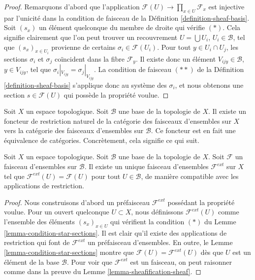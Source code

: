 \begin{proof}
Remarquons d'abord que l'application
$\mathcal{F}(U) \to \prod\nolimits_{x \in U} \mathcal{F}_x$
est injective par l'unicité dans la condition de faisceau
de la Définition \ref{definition-sheaf-basis}. Soit $(s_x)$
un élément quelconque du membre de droite qui vérifie $(*)$.
Cela signifie clairement que l'on peut trouver un recouvrement $U = \bigcup U_i$,
$U_i \in \mathcal{B}$, tel que $(s_x)_{x \in U_i}$ provienne
de certains $\sigma_i \in \mathcal{F}(U_i)$. Pour tout $y \in U_i \cap U_j$,
les sections $\sigma_i$ et $\sigma_j$ coïncident dans la fibre
$\mathcal{F}_y$. Il existe donc un élément $V_{ijy} \in \mathcal{B}$,
$y \in V_{ijy}$, tel que $\sigma_i|_{V_{ijy}} = \sigma_j|_{V_{ijy}}$.
La condition de faisceau $(**)$ de la Définition \ref{definition-sheaf-basis}
s'applique donc au système des $\sigma_i$, et nous obtenons une section
$s \in \mathcal{F}(U)$ qui possède la propriété voulue.
\end{proof}

\noindent
Soit $X$ un espace topologique.
Soit $\mathcal{B}$ une base de la topologie de $X$.
Il existe un foncteur de restriction naturel de la catégorie
des faisceaux d'ensembles sur $X$ vers la catégorie des faisceaux
d'ensembles sur $\mathcal{B}$. Ce foncteur est en fait une équivalence
de catégories. Concrètement, cela signifie ce qui suit.

\begin{lemma}
\label{lemma-extend-off-basis}
Soit $X$ un espace topologique.
Soit $\mathcal{B}$ une base de la topologie de $X$.
Soit $\mathcal{F}$ un faisceau d'ensembles sur $\mathcal{B}$.
Il existe un unique faisceau d'ensembles $\mathcal{F}^{ext}$
sur $X$ tel que $\mathcal{F}^{ext}(U) = \mathcal{F}(U)$
pour tout $U \in \mathcal{B}$, de manière compatible avec les applications
de restriction.
\end{lemma}

\begin{proof}
Nous construisons d'abord un préfaisceau $\mathcal{F}^{ext}$ possédant la
propriété voulue. Pour un ouvert quelconque $U \subset X$, nous
définissons $\mathcal{F}^{ext}(U)$ comme l'ensemble des éléments
$(s_x)_{x \in U}$ qui vérifient la condition $(*)$ du
Lemme \ref{lemma-condition-star-sections}.
Il est clair qu'il existe des applications de restriction
qui font de $\mathcal{F}^{ext}$ un préfaisceau d'ensembles.
En outre, le Lemme \ref{lemma-condition-star-sections} montre que
$\mathcal{F}(U) = \mathcal{F}^{ext}(U)$
dès que $U$ est un élément de la base $\mathcal{B}$.
Pour voir que $\mathcal{F}^{ext}$ est un faisceau, on peut
raisonner comme dans la preuve du Lemme \ref{lemma-sheafification-sheaf}.
\end{proof}

